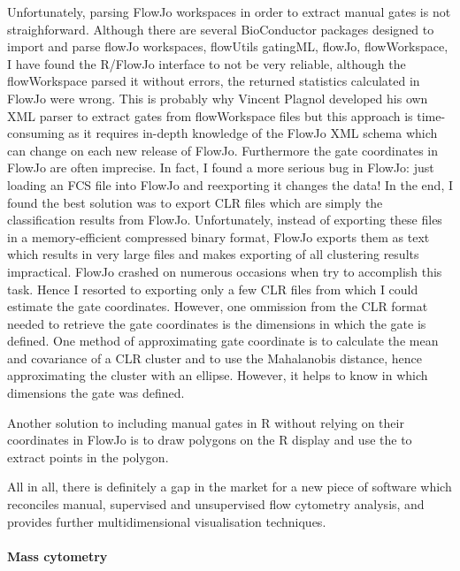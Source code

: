 Unfortunately, parsing FlowJo workspaces in order to extract manual gates is not straighforward.
Although there are several BioConductor packages designed to import and parse flowJo workspaces, flowUtils gatingML, flowJo, flowWorkspace, I have found the R/FlowJo interface to not be very reliable, although the flowWorkspace parsed it without errors, the returned statistics calculated in FlowJo were wrong.
This is probably why Vincent Plagnol developed his own XML parser to extract gates from flowWorkspace files but this approach is time-consuming as it requires in-depth knowledge of the FlowJo XML schema which can change on each new release of FlowJo.
Furthermore the gate coordinates in FlowJo are often imprecise.
In fact, I found a more serious bug in FlowJo: just loading an FCS file into FlowJo and reexporting it changes the data!
In the end, I found the best solution was to export CLR files which are simply the classification results from FlowJo.
Unfortunately, instead of exporting these files in a memory-efficient compressed binary format, FlowJo exports them as text which results in very large files and makes exporting of all clustering results impractical.  FlowJo crashed on numerous occasions when try to accomplish this task.
Hence I resorted to exporting only a few CLR files from which I could estimate the gate coordinates.
However, one ommission from the CLR format needed to retrieve the gate coordinates is the dimensions in which the gate is defined.
One method of approximating gate coordinate is to calculate the mean and covariance of a CLR cluster and to use the Mahalanobis distance, hence approximating the cluster with an ellipse.
However, it helps to know in which dimensions the gate was defined.

Another solution to including manual gates in R without relying on their coordinates in FlowJo is to draw polygons on the R display and use the  to extract points in the polygon.

All in all, there is definitely a gap in the market for a new piece of software which reconciles manual, supervised and unsupervised flow cytometry analysis, and provides further multidimensional visualisation techniques.


\paragraph{Mass cytometry}

